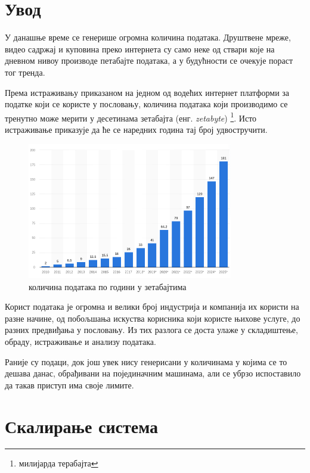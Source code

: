 \documentclass[12pt,oneside]{memoir}
\begin{document}
\section{Увод}
\label{sec:uvod}

У данашње време се генерише огромна количина података. Друштвене мреже, видео садржај и куповина преко интернета су само неке од ствари које на дневном нивоу производе петабајте података, а у будућности се очекује пораст тог тренда.

Према истраживању приказаном на једном од водећих интернет платформи за податке који се користе у пословању, количина података који производимо се тренутно може мерити у десетинама зетабајта (енг. \textit{zetabyte}) \footnote{милијарда терабајта}. Исто истраживање приказује да ће се наредних година тај број удвостручити. \cite{volume_data}

\begin{figure}[!ht]
  \centering
  \includegraphics[width=0.8\textwidth]{pictures/Total_data_volume_worldwide_2010_2025_statista.png}
  \caption{количина података по години у зетабајтима}
  \label{fig:kolicina_podataka}
\end{figure}

Корист података је огромна и велики број индустрија и компанија их користи на разне начине, од побољшања искуства корисника који користе њихове услуге, до разних предвиђања у пословању. Из тих разлога се доста улаже у складиштење, обраду, истраживање и анализу података.

Раније су подаци, док још увек нису генерисани у количинама у којима се то дешава данас, обрађивани на појединачним машинама, али се убрзо испоставило да такав приступ има своје лимите.

\section{Скалирање система}
\label{sec:skaliranje}
\end{document}
